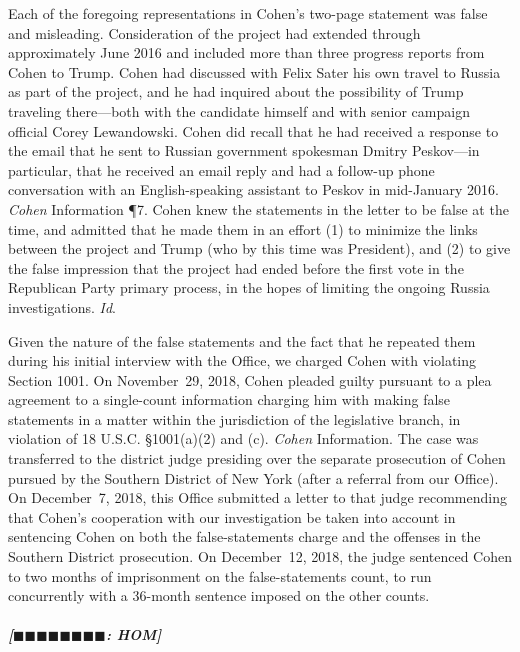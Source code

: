 Each of the foregoing representations in Cohen's two-page statement was false and misleading.
Consideration of the project had extended through approximately June 2016 and included more than three progress reports from Cohen to Trump.
Cohen had discussed with Felix Sater his own travel to Russia as part of the project, and he had inquired about the possibility of Trump traveling there---both with the candidate himself and with senior campaign official Corey Lewandowski.
Cohen did recall that he had received a response to the email that he sent to Russian government spokesman Dmitry Peskov---in particular, that he received an email reply and had a follow-up phone conversation with an English-speaking assistant to Peskov in mid-January 2016.
\textit{Cohen} Information \P 7.
Cohen knew the statements in the letter to be false at the time, and admitted that he made them in an effort (1) to minimize the links between the project and Trump (who by this time was President), and (2) to give the false impression that the project had ended before the first vote in the Republican Party primary process, in the hopes of limiting the ongoing Russia investigations.
\textit{Id}.

Given the nature of the false statements and the fact that he repeated them during his initial interview with the Office, we charged Cohen with violating Section 1001.
On November~29, 2018, Cohen pleaded guilty pursuant to a plea agreement to a single-count information charging him with making false statements in a matter within the jurisdiction of the legislative branch, in violation of 18 U.S.C. \S 1001(a)(2) and (c).
\textit{Cohen} Information.
The case was transferred to the district judge presiding over the separate prosecution of Cohen pursued by the Southern District of New York (after a referral from our Office).
On December~7, 2018, this Office submitted a letter to that judge recommending that Cohen's cooperation with our investigation be taken into account in sentencing Cohen on both the false-statements charge and the offenses in the Southern District prosecution.
On December~12, 2018, the judge sentenced Cohen to two months of imprisonment on the false-statements count, to run concurrently with a 36-month sentence imposed on the other counts.

\subparagraph{[$\blacksquare\blacksquare\blacksquare\blacksquare\blacksquare\blacksquare\blacksquare\blacksquare$: HOM]}


